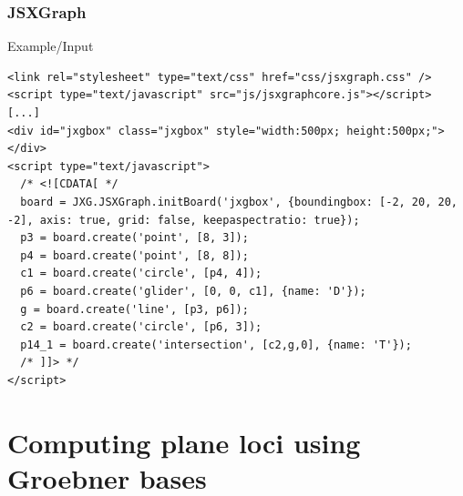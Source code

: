 \documentclass{beamer}
\begin{document}
\begin{frame}[fragile]
  \frametitle{JSXGraph} 
  \begin{block}{Example/Input}
    \begin{lstlisting}
<link rel="stylesheet" type="text/css" href="css/jsxgraph.css" />
<script type="text/javascript" src="js/jsxgraphcore.js"></script>
[...]
<div id="jxgbox" class="jxgbox" style="width:500px; height:500px;"></div>
<script type="text/javascript">
  /* <![CDATA[ */
  board = JXG.JSXGraph.initBoard('jxgbox', {boundingbox: [-2, 20, 20, -2], axis: true, grid: false, keepaspectratio: true});
  p3 = board.create('point', [8, 3]);
  p4 = board.create('point', [8, 8]);
  c1 = board.create('circle', [p4, 4]);
  p6 = board.create('glider', [0, 0, c1], {name: 'D'});
  g = board.create('line', [p3, p6]);
  c2 = board.create('circle', [p6, 3]);
  p14_1 = board.create('intersection', [c2,g,0], {name: 'T'});
  /* ]]> */
</script>
    \end{lstlisting}
  \end{block}
\end{frame}




\section{Computing plane loci using Groebner bases}

\end{document}
